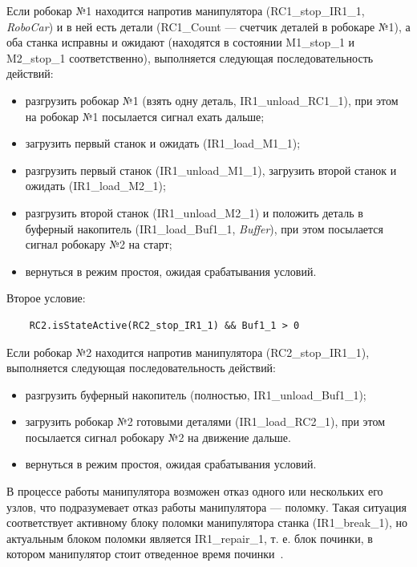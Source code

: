 Если робокар №1 находится напротив манипулятора (RC1\_stop\_IR1\_1, \textit{RoboCar}) и в ней есть детали (RC1\_Count --- счетчик деталей в робокаре №1), а оба станка исправны и ожидают (находятся в состоянии M1\_stop\_1 и M2\_stop\_1 соответственно), выполняется следующая последовательность действий:

\begin{itemize}
    \item разгрузить робокар №1 (взять одну деталь, IR1\_unload\_RC1\_1), при этом на робокар №1 посылается сигнал ехать дальше;
    \item загрузить первый станок и ожидать (IR1\_load\_M1\_1);
    \item разгрузить первый станок (IR1\_unload\_M1\_1), загрузить второй станок и ожидать (IR1\_load\_M2\_1);
    \item разгрузить второй станок (IR1\_unload\_M2\_1) и положить деталь в буферный накопитель (IR1\_load\_Buf1\_1, \textit{Buffer}), при этом посылается сигнал робокару №2 на старт;
    \item вернуться в режим простоя, ожидая срабатывания условий.
\end{itemize}

Второе условие:

\begin{verbatim}
    RC2.isStateActive(RC2_stop_IR1_1) && Buf1_1 > 0   
\end{verbatim}

Если робокар №2 находится напротив манипулятора (RC2\_stop\_IR1\_1), выполняется следующая последовательность действий:

\begin{itemize}
    \item разгрузить буферный накопитель (полностью, IR1\_unload\_Buf1\_1);
    \item загрузить робокар №2 готовыми деталями (IR1\_load\_RC2\_1), при этом посылается сигнал робокару №2 на движение дальше.
    \item вернуться в режим простоя, ожидая срабатывания условий.
\end{itemize}

В процессе работы манипулятора возможен отказ одного или нескольких его узлов, что подразумевает отказ работы манипулятора --- поломку. Такая ситуация соответствует активному блоку поломки манипулятора станка (IR1\_break\_1), но актуальным блоком поломки является IR1\_repair\_1, т. е. блок починки, в котором манипулятор стоит отведенное время починки~\cite{pech:meth}.

